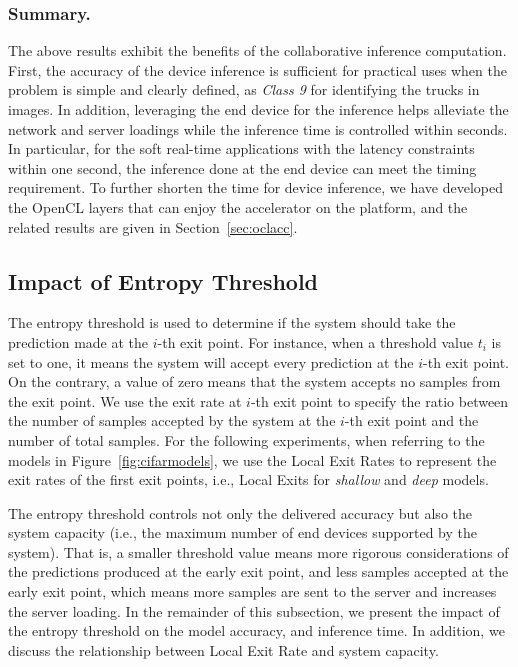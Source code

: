 \documentclass[format=acmsmall, review=false, screen=true]{acmart}
\def\figurename{Figure}
\def\sectionname{Section}
\begin{document}
\subsubsection{Summary.} The above results exhibit the benefits of the collaborative inference computation. First, the accuracy of the device inference is sufficient for practical uses when the problem is simple and clearly defined, as \emph{Class 9} for identifying the trucks in images. In addition, leveraging the end device for the inference helps alleviate the network and server loadings while the inference time is controlled within seconds. In particular, for the soft real-time applications with the latency constraints within one second, the inference done at the end device can meet the timing requirement. To further shorten the time for device inference, we have developed the OpenCL layers that can enjoy the accelerator on the platform, and the related results are given in \sectionname~\ref{sec:oclacc}.


\subsection{Impact of Entropy Threshold}
\label{sec:entropythreshold}

The entropy threshold is used to determine if the system should take the prediction made at the $i$-th exit point. For instance, when a threshold value $t_{i}$ is set to one, it means the system will accept every prediction at the $i$-th exit point. On the contrary, a value of zero means that the system accepts no samples from the exit point.
We use the exit rate at $i$-th exit point to specify the ratio between the number of samples accepted by the system at the $i$-th exit point and the number of total samples. For the following experiments, when referring to the models in \figurename~\ref{fig:cifarmodels}, we use the Local Exit Rates to represent the exit rates of the first exit points, i.e., Local Exits for \emph{shallow} and \emph{deep} models.

The entropy threshold controls not only the delivered accuracy but also the system capacity (i.e., the maximum number of end devices supported by the system).
That is, a smaller threshold value means more rigorous considerations of the predictions produced at the early exit point, and less samples accepted at the early exit point, which means more samples are sent to the server and increases the server loading. In the remainder of this subsection, we present the impact of the entropy threshold on the model accuracy, and inference time. In addition, we discuss the relationship between Local Exit Rate and system capacity.
\end{document}
